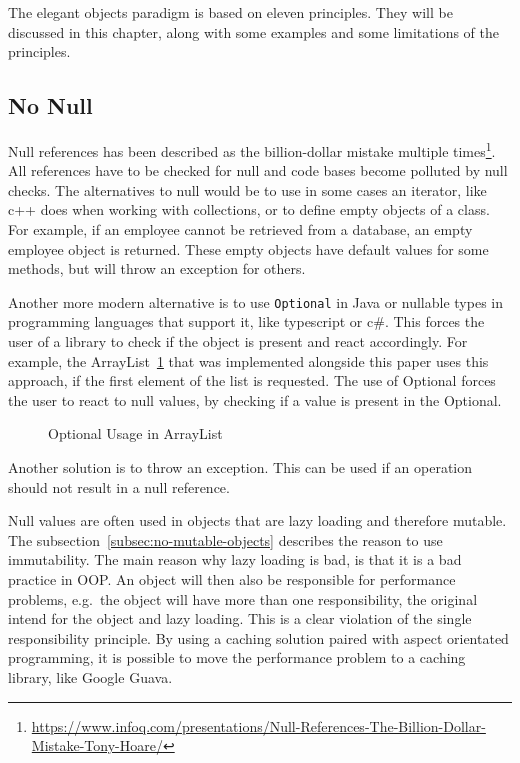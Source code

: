 The elegant objects paradigm is based on eleven principles.
They will be discussed in this chapter, along with some examples and some limitations of the principles.

\subsection{No Null}\label{subsec:no-null}
Null references has been described as the billion-dollar mistake multiple times\footnote{\url{https://www.infoq.com/presentations/Null-References-The-Billion-Dollar-Mistake-Tony-Hoare/}}.
All references have to be checked for null and code bases become polluted by null checks.
The alternatives to null would be to use in some cases an iterator, like c++ does when working with collections, or to define empty objects of a class.
For example, if an employee cannot be retrieved from a database, an empty employee object is returned.
These empty objects have default values for some methods, but will throw an exception for others.

Another more modern alternative is to use \texttt{Optional} in Java or nullable types in programming languages that support it, like typescript or c\#.
This forces the user of a library to check if the object is present and react accordingly.
For example, the ArrayList\ \ref{fig:optional-usage} that was implemented alongside this paper uses this approach, if the first element of the list is requested.
The use of Optional forces the user to react to null values, by checking if a value is present in the Optional.

\begin{figure}[h]
    \caption{Optional Usage in ArrayList}
    
    \label{fig:optional-usage}
\end{figure}

Another solution is to throw an exception.
This can be used if an operation should not result in a null reference.

Null values are often used in objects that are lazy loading and therefore mutable.
The subsection\ \ref{subsec:no-mutable-objects} describes the reason to use immutability.
The main reason why lazy loading is bad, is that it is a bad practice in \gls{OOP}.
An object will then also be responsible for performance problems, e.g.\ the object will have more than one responsibility,
the original intend for the object and lazy loading.
This is a clear violation of the single responsibility principle.
By using a caching solution paired with aspect orientated programming, it is possible to move the performance problem to a caching library, like Google Guava.\cite{elegant-objects}

